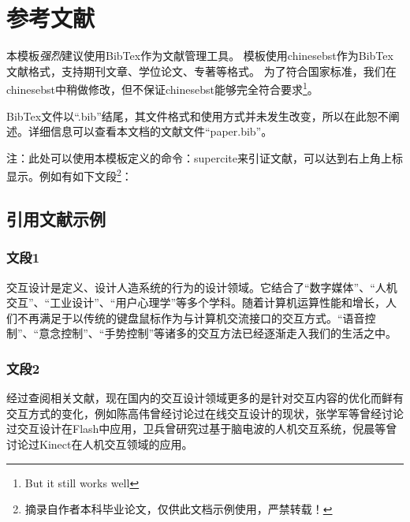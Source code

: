     \section{参考文献}
        本模板\emph{强烈}建议使用BibTex作为文献管理工具。
        模板使用chinesebst作为BibTex文献格式，支持期刊文章、学位论文、专著等格式。
        为了符合国家标准，我们在chinesebst中稍做修改，但不保证chinesebst能够完全符合要求\footnote{But it still works well}。

        BibTex文件以“.bib”结尾，其文件格式和使用方式并未发生改变，所以在此恕不阐述。详细信息可以查看本文档的文献文件“paper.bib”。

        注：此处可以使用本模板定义的命令：\tbs supercite{}来引证文献，可以达到右上角上标显示。例如有如下文段\footnote{摘录自作者本科毕业论文，仅供此文档示例使用，严禁转载！}：

        \subsection{引用文献示例}
            \subsubsection{文段1}
                交互设计是定义、设计人造系统的行为的设计领域\supercite{book_interaction_design}。它结合了“数字媒体”、“人机交互”、“工业设计”、“用户心理学”等多个学科。随着计算机运算性能和增长，人们不再满足于以传统的键盘鼠标作为与计算机交流接口的交互方式。“语音控制”、“意念控制”、“手势控制”等诸多的交互方法已经逐渐走入我们的生活之中。

            \subsubsection{文段2}
                经过查阅相关文献，现在国内的交互设计领域更多的是针对交互内容的优化而鲜有交互方式的变化，例如陈高伟曾经讨论过在线交互设计的现状\supercite{article_current_situation_and_trend_of_design_of_online_interaction}，张学军等曾经讨论过交互设计在Flash中应用\supercite{article_flash_interaction_design}，卫兵曾研究过基于脑电波的人机交互系统\supercite{thesis_design_and_research_of_a_hci_control_system_based_on_eeg_alpha_reythm}，倪晨等曾讨论过Kinect在人机交互领域的应用\supercite{article_the_research_and_application_of_kinect_technology_in_the_field_of_human_computer_interaction}。



        
